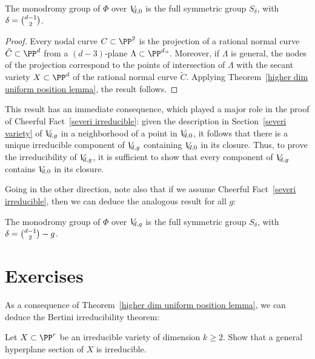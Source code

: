 \begin{proposition}
The monodromy group of $\Phi$ over $\VD{0}$ is the full symmetric group
\label{plane curve nodes}
$S_\delta$, with $\delta = \tbinom{d-1}{2}$.
\end{proposition}

\begin{proof}
Every
nodal curve
%
$C \subset \PP^2$ is the projection of a
rational normal curve
%
$\tilde C \subset \PP^d$ from a $(d-3)$-plane
$\Lambda \subset \PP^d` `$. Moreover, if $\Lambda$ is general,  the nodes
of the projection correspond to the points of intersection of $\Lambda$
with the
secant variety
%
$X \subset \PP^d$ of the rational normal curve
$\tilde C$. Applying Theorem~\ref{higher dim uniform position lemma},
the result follows.
\end{proof}

This result has an immediate consequence, which played a major role in the
proof of Cheerful Fact~\ref{severi irreducible}: given the description in
Section~\ref{severi variety} of $\VD{g}$ in a neighborhood of a point
in $\VD{0}$, it follows that there is a unique irreducible component
of $\VD{g}$ containing $\VD{0}$ in its closure. Thus, to prove the
irreducibility of $\VD{g}$, it is sufficient to show that every component
of $\VD{g}$ contains $\VD{0}$ in its closure.

Going in the other direction, note also that if we assume Cheerful
Fact~\ref{severi irreducible}, then we can deduce the analogous result
for all $g$:

\begin{proposition}
The monodromy group of $\Phi$ over $\VD{g}$ is the full symmetric group
$S_\delta$, with $\delta = \tbinom{d-1}{2} - g$.
\end{proposition}

\section{Exercises}

As a consequence of Theorem~\ref{higher dim uniform position lemma},
we can deduce the
Bertini irreducibility theorem:
%

\begin{exercise}
Let $X \subset \PP^r$ be an irreducible variety of dimension $k \geq 2$.
Show that a general hyperplane section of $X$ is irreducible.
\end{exercise}

